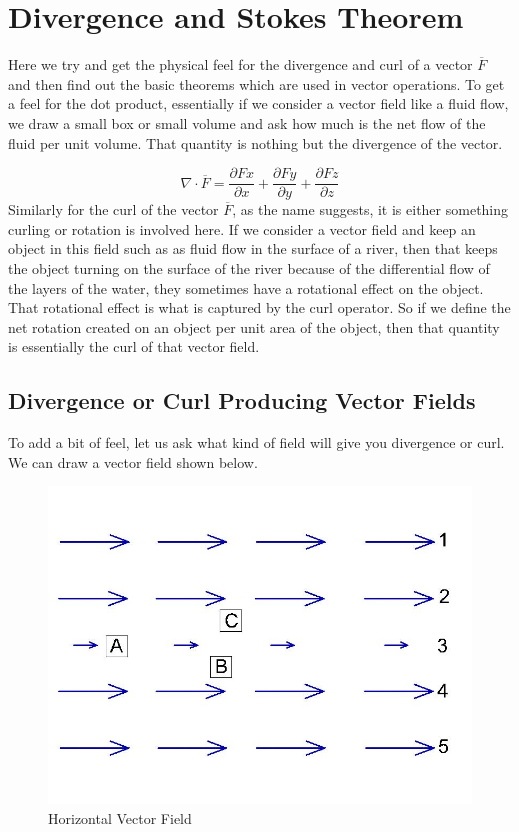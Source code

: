 \chapter{Divergence and Stokes Theorem}\label{lec:lec17}
Here we try and get the physical feel for the divergence and curl of a vector $\overline{F}$  and then find out the basic theorems which are used in vector operations.
To get a feel for the dot product, essentially if we consider a vector field like a fluid flow, we draw a small box or small volume and ask how much is the net flow of the fluid per unit volume. That quantity is nothing but the divergence of the vector.

\begin{equation}
\nabla\cdot \overline{F} = \frac{\partial Fx}{\partial x} + \frac{\partial Fy}{\partial y} + \frac{\partial Fz}{\partial z}	
\end{equation}
Similarly for the curl of the vector $\overline{F}$, as the name suggests, it is either something curling or rotation is involved here. If we consider a vector field and keep an object in this field such as as fluid flow in the surface of a river, then that keeps the object turning on the surface of the river because of the differential flow of the layers of the water, they sometimes have a rotational effect on the object. That rotational effect is what is captured by the curl operator. So if we define the net rotation created on an object per unit area of the object, then that quantity is essentially the curl of that vector field.

\section{Divergence or Curl Producing Vector Fields}
To add a bit of feel, let us ask what kind of field will give you divergence or curl. We can draw a vector field shown below.
\begin{figure}[h]
\centering
\includegraphics[width=1\linewidth]{./graphics/fig171}
\caption{Horizontal Vector Field}
\end{figure}

